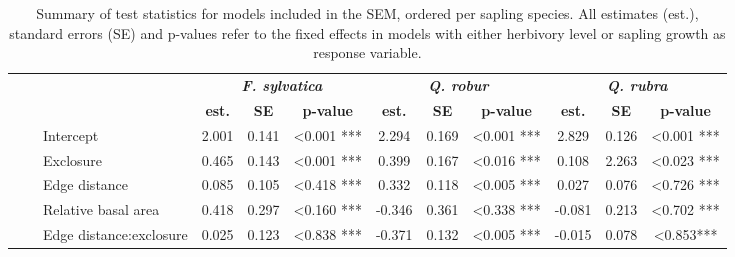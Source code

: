 \documentclass[b5paper,10pt]{book} %
\begin{document}
	\begin{sidewaystable}
	  \begin{center}
	 \begin{footnotesize}
	    \caption{Summary of test statistics for models included in the SEM, ordered per sapling species. All estimates (est.), standard errors (SE) and p-values refer to the fixed effects in models with either herbivory level or sapling growth as response variable.}
	    \label{Tab4.1}
	    \begin{tabular}{c c l c c c c c c c c c}
	      \toprule
		& & & \multicolumn{3}{c}{\textbf{\textit{F. sylvatica}}} & \multicolumn{3}{c}{\textbf{\textit{Q. robur}}} & \multicolumn{3}{c}{\textbf{\textit{Q. rubra}}}\\
		& & & \textbf{est.} & \textbf{SE} & \textbf{p-value} & \textbf{est.} & \textbf{SE} & \textbf{p-value} & \textbf{est.} & \textbf{SE} & \textbf{p-value}\\
		\multirow{6}{*}{\rotatebox{90}{\textbf{Herbivory}}} & \multirow{6}{*}{\rotatebox{90}{\textbf{level}}} & Intercept & 2.001 & 0.141 & \textless0.001 *** & 2.294 & 0.169 & \textless0.001 *** & 2.829 & 0.126 & \textless0.001 *** \\
		\multirow{6}{*}{} & \multirow{6}{*}{} & Exclosure & 0.465 & 0.143 & \color{white}\textless\color{black}0.001 **\color{white}*\color{black} & 0.399 & 0.167 & \color{white}\textless\color{black}0.016 *\color{white}**\color{black} & 0.108 & 2.263 & \color{white}\textless\color{black}0.023 *\color{white}**\color{black}\\
		\multirow{6}{*}{} & \multirow{6}{*}{} & Edge distance & 0.085 & 0.105 & \color{white}\textless\color{black}0.418 \color{white}***\color{black} & 0.332 & 0.118 & \color{white}\textless\color{black}0.005 **\color{white}*\color{black} & 0.027 & 0.076 & \color{white}\textless\color{black}0.726 \color{white}***\color{black} \\
		\multirow{6}{*}{} & \multirow{6}{*}{} & Relative basal area & 0.418 & 0.297 & \color{white}\textless\color{black}0.160 \color{white}***\color{black} & -0.346 & 0.361 & \color{white}\textless\color{black}0.338 \color{white}***\color{black} & -0.081 & 0.213 & \color{white}\textless\color{black}0.702 \color{white}***\color{black} \\
		\multirow{6}{*}{} & \multirow{6}{*}{} & Edge distance:exclosure & 0.025 & 0.123 & \color{white}\textless\color{black}0.838 \color{white}***\color{black} & -0.371 & 0.132 & \color{white}\textless\color{black}0.005 **\color{white}*\color{black} & -0.015 & 0.078 & \color{white}\textless\color{black}0.853\color{white}***\color{black}\\

\end{tabular}
\end{footnotesize}
\end{center}
\end{sidewaystable}
\end{document}
